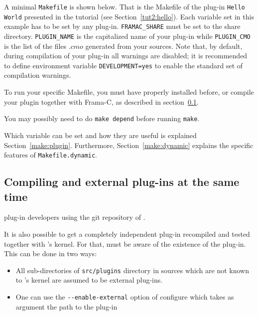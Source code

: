 \begin{example}
A minimal \texttt{Makefile} is shown below. That is the Makefile of the plug-in
\texttt{Hello World} presented in the tutorial (see
Section~\ref{tut2:hello}). Each variable set in this example has to be set
by any plug-in.
\texttt{FRAMAC\_SHARE} must be set to the \framac share directory.
\texttt{PLUGIN\_NAME} is the capitalized name of your plug-in while
\texttt{PLUGIN\_CMO} is the list of the files $.cmo$ generated from your \caml
sources.
Note that, by default, during compilation of your plug-in all warnings are
disabled; it is recommended to define environment variable
\texttt{DEVELOPMENT=yes} to enable the standard set of compilation warnings.
\end{example}

\begin{important}
To run your specific Makefile, you must have properly installed \framac
before, or compile your plugin together with Frama-C, as described in
section~\ref{dynamic-make:comp-same-time}.
\end{important}

You may possibly need to do \texttt{make depend} before running
\texttt{make}.

Which variable can be set and how they are useful is explained
Section~\ref{make:plugin}. Furthermore, Section~\ref{make:dynamic} explains
the specific features of \texttt{Makefile.dynamic}.


\subsection{Compiling \framac and external plug-ins at the same time}
\label{dynamic-make:comp-same-time}
\begin{target}
  plug-in developers using the git repository of \framac.
\end{target}
It is also possible to get a completely independent plug-in
recompiled and tested together with \framac's kernel. For that,
\framac must be aware of the existence of the plug-in. This can be
done in two ways:
\begin{itemize}
\item All sub-directories of \verb+src/plugins+ directory in \framac sources
  which are not known to \framac's kernel are assumed to be external
  plug-ins.
\item One can use the \verb+--enable-external+ option of configure
  which takes as argument the path to the plug-in
\end{itemize}


